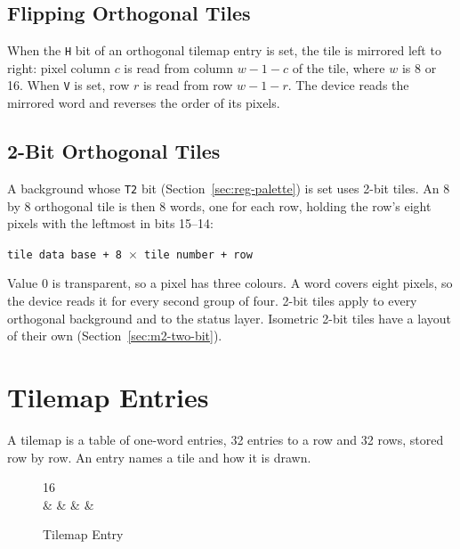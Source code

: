 \subsection{Flipping Orthogonal Tiles}

When the \texttt{H} bit of an orthogonal tilemap entry is set, the tile is mirrored left to right: pixel column $c$ is
read from column $w - 1 - c$ of the tile, where $w$ is 8 or 16. When \texttt{V} is set, row $r$ is read from row $w - 1
	- r$. The device reads the mirrored word and reverses the order of its pixels.

\subsection{2-Bit Orthogonal Tiles}
\label{sec:flat-two-bit}

A background whose \texttt{T2} bit (Section~\ref{sec:reg-palette}) is set uses 2-bit tiles. An 8 by 8 orthogonal tile
is then 8 words, one for each row, holding the row's eight pixels with the leftmost in bits 15--14:

\begin{center}
	\texttt{tile data base + 8 $\times$ tile number + row}
\end{center}

Value 0 is transparent, so a pixel has three colours. A word covers eight pixels, so the device reads it for every
second group of four. 2-bit tiles apply to every orthogonal background and to the status layer. Isometric 2-bit tiles
have a layout of their own (Section~\ref{sec:m2-two-bit}).

\section{Tilemap Entries}
\label{sec:tilemap-entry}

A tilemap is a table of one-word entries, 32 entries to a row and 32 rows, stored row by row. An entry names a tile and
how it is drawn.

\begin{figure}[H]
	\centering
	\begin{bytefield}[bitwidth=1.5em]{16}
		 \\
		 &
		 &
		 &
		 &
	\end{bytefield}
	\caption{Tilemap Entry}
	\label{fig:tilemap-entry}
\end{figure}

